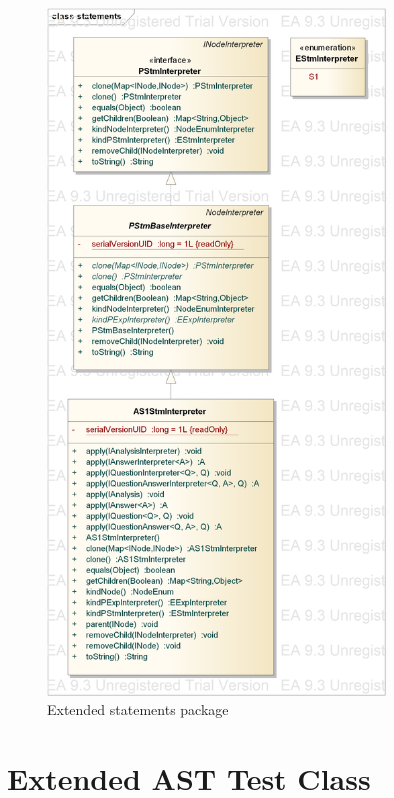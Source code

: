 \documentclass{overturerepchap}
\begin{document}
\begin{figure}[htb]
\centering
\includegraphics[width=0.8\textwidth]{figures/extended_statements}
\caption{Extended statements  package}
\end{figure}

\section{Extended AST Test Class}


\end{document}
